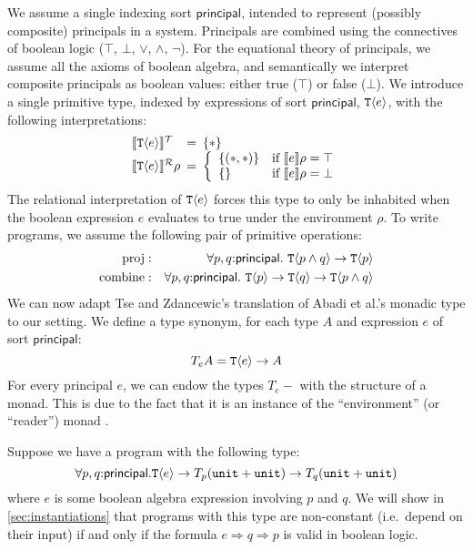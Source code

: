 We assume a single indexing sort $\mathsf{principal}$, intended to
represent (possibly composite) principals in a system. Principals are
combined using the connectives of boolean logic ($\top$, $\bot$,
$\lor$, $\land$, $\lnot$). For the equational theory of principals, we
assume all the axioms of boolean algebra, and semantically we
interpret composite principals as boolean values: either true ($\top$)
or false ($\bot$). We introduce a single primitive type, indexed by
expressions of sort $\mathsf{principal}$, $\textup{\texttt{T}}\langle e \rangle$, with the
following interpretations:
\begin{displaymath}
  \begin{array}{l@{\hspace{0.5em}=\hspace{0.5em}}l}
    \tySem{\tyPrim{T}{e}} & \{*\} \\
    \rsem{\tyPrim{T}{e}}{}\rho & \left\{
      \begin{array}{ll}
        \{(*,*)\} & \textrm{if }\sem{e}\rho = \top \\
        \{\}      & \textrm{if }\sem{e}\rho = \bot
      \end{array}
      \right.
  \end{array}
\end{displaymath}
The relational interpretation of $\textup{\texttt{T}}\langle e \rangle$ forces this type to
only be inhabited when the boolean expression $e$ evaluates to true
under the environment $\rho$. To write programs, we assume the
following pair of primitive operations:
\begin{eqnarray*}
  \mathrm{proj} & : & \forall p, q\mathord:\mathsf{principal}.\ \tyPrim{T}{p \land q} \to \tyPrim{T}{p} \\
  \mathrm{combine} & : & \forall p, q\mathord:\mathsf{principal}.\ \tyPrim{T}{p} \to \tyPrim{T}{q} \to \tyPrim{T}{p \land q}
\end{eqnarray*}
We can now adapt Tse and Zdancewic's translation of Abadi et al.'s
monadic type to our setting. We define a type synonym, for each type
$A$ and expression $e$ of sort $\mathsf{principal}$:
\begin{displaymath}
  T_eA = \textup{\texttt{T}}\langle e \rangle \to A
\end{displaymath}
For every principal $e$, we can endow the types $T_e-$ with the
structure of a monad. This is due to the fact that it is an instance
of the ``environment'' (or ``reader'') monad \cite{jones95functional}.

\begin{example}
  Suppose we have a program with the following type:
  \begin{displaymath}
    \forall p,q\mathord:\mathsf{principal}. \textup{\texttt{T}}\langle e \rangle \to T_p(\texttt{unit} + \texttt{unit}) \to T_q(\texttt{unit} + \texttt{unit})
  \end{displaymath}
  where $e$ is some boolean algebra expression involving $p$ and
  $q$. We will show in \autoref{sec:instantiations} that programs with
  this type are non-constant (i.e.~depend on their input) if and only
  if the formula $e \Rightarrow q \Rightarrow p$ is valid in boolean
  logic.
\end{example}

